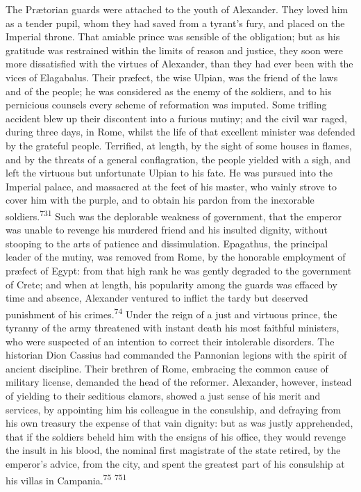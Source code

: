 The Prætorian guards were attached to the youth of Alexander.
They loved him as a tender pupil, whom they had saved from a
tyrant’s fury, and placed on the Imperial throne. That amiable
prince was sensible of the obligation; but as his gratitude was
restrained within the limits of reason and justice, they soon
were more dissatisfied with the virtues of Alexander, than they
had ever been with the vices of Elagabalus. Their præfect, the
wise Ulpian, was the friend of the laws and of the people; he was
considered as the enemy of the soldiers, and to his pernicious
counsels every scheme of reformation was imputed. Some trifling
accident blew up their discontent into a furious mutiny; and the
civil war raged, during three days, in Rome, whilst the life of
that excellent minister was defended by the grateful people.
Terrified, at length, by the sight of some houses in flames, and
by the threats of a general conflagration, the people yielded
with a sigh, and left the virtuous but unfortunate Ulpian to his
fate. He was pursued into the Imperial palace, and massacred at
the feet of his master, who vainly strove to cover him with the
purple, and to obtain his pardon from the inexorable soldiers.\textsuperscript{731}
Such was the deplorable weakness of government, that the
emperor was unable to revenge his murdered friend and his
insulted dignity, without stooping to the arts of patience and
dissimulation. Epagathus, the principal leader of the mutiny, was
removed from Rome, by the honorable employment of præfect of
Egypt: from that high rank he was gently degraded to the
government of Crete; and when at length, his popularity among the
guards was effaced by time and absence, Alexander ventured to
inflict the tardy but deserved punishment of his crimes.\textsuperscript{74} Under
the reign of a just and virtuous prince, the tyranny of the army
threatened with instant death his most faithful ministers, who
were suspected of an intention to correct their intolerable
disorders. The historian Dion Cassius had commanded the Pannonian
legions with the spirit of ancient discipline. Their brethren of
Rome, embracing the common cause of military license, demanded
the head of the reformer. Alexander, however, instead of yielding
to their seditious clamors, showed a just sense of his merit and
services, by appointing him his colleague in the consulship, and
defraying from his own treasury the expense of that vain dignity:
but as was justly apprehended, that if the soldiers beheld him
with the ensigns of his office, they would revenge the insult in
his blood, the nominal first magistrate of the state retired, by
the emperor’s advice, from the city, and spent the greatest part
of his consulship at his villas in Campania.\textsuperscript{75} \textsuperscript{751}

